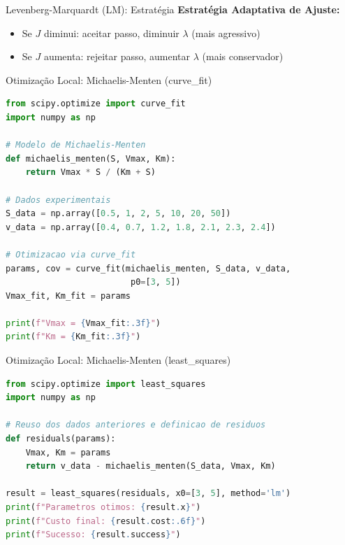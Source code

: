 \begin{frame}{Levenberg-Marquardt (LM): Estratégia}
\textbf{Estratégia Adaptativa de Ajuste:}
\begin{itemize}
    \item Se $J$ diminui: aceitar passo, diminuir $\lambda$ (mais agressivo)
    \item Se $J$ aumenta: rejeitar passo, aumentar $\lambda$ (mais conservador)
\end{itemize}

\vspace{0.5cm}

\end{frame}

\begin{frame}[fragile]{Otimização Local: Michaelis-Menten (curve\_fit)}
\begin{lstlisting}[language=Python, caption=Ajuste simples usando curve\_fit, basicstyle=\ttfamily\scriptsize]
from scipy.optimize import curve_fit
import numpy as np

# Modelo de Michaelis-Menten
def michaelis_menten(S, Vmax, Km):
    return Vmax * S / (Km + S)

# Dados experimentais
S_data = np.array([0.5, 1, 2, 5, 10, 20, 50])
v_data = np.array([0.4, 0.7, 1.2, 1.8, 2.1, 2.3, 2.4])

# Otimizacao via curve_fit
params, cov = curve_fit(michaelis_menten, S_data, v_data,
                         p0=[3, 5])
Vmax_fit, Km_fit = params

print(f"Vmax = {Vmax_fit:.3f}")
print(f"Km = {Km_fit:.3f}")
\end{lstlisting}
\end{frame}

\begin{frame}[fragile]{Otimização Local: Michaelis-Menten (least\_squares)}
\begin{lstlisting}[language=Python, caption=Ajuste via least\_squares (LM), basicstyle=\ttfamily\footnotesize]
from scipy.optimize import least_squares
import numpy as np

# Reuso dos dados anteriores e definicao de residuos
def residuals(params):
    Vmax, Km = params
    return v_data - michaelis_menten(S_data, Vmax, Km)

result = least_squares(residuals, x0=[3, 5], method='lm')
print(f"Parametros otimos: {result.x}")
print(f"Custo final: {result.cost:.6f}")
print(f"Sucesso: {result.success}")
\end{lstlisting}
\end{frame}


